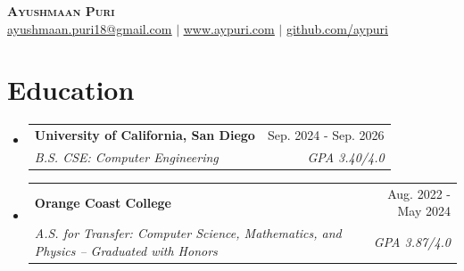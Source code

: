 \documentclass[letterpaper,11pt]{article}
\makeatletter
\newcommand{\resumeSubheading}[4]{
  \vspace{-1pt}\item
    \begin{tabular*}{0.97\textwidth}[t]{l@{\extracolsep{\fill}}r}
      \textbf{#1} & #2 \\
      \textit{\small#3} & \textit{\small #4} \\
    \end{tabular*}\vspace{-8pt}
}
\newcommand{\resumeSubHeadingListStart}{\begin{itemize}[leftmargin=0.15in, label={}]}
\newcommand{\resumeSubHeadingListEnd}{\end{itemize}}
\makeatother
\begin{document}
\begin{center}
    \textbf{\huge \scshape Ayushmaan Puri} \\ \vspace{1pt}
    \href{mailto:ayushmaan.puri18@gmail.com}{\underline{ayushmaan.puri18@gmail.com}} $|$ 
    \href{https://www.aypuri.com}{\underline{www.aypuri.com}} $|$
    \href{https://github.com/aypuri}{\underline{github.com/aypuri}}
\end{center}
\vspace{-25pt}

\section{Education}
  \resumeSubHeadingListStart
    \resumeSubheading
      {University of California, San Diego}{Sep. 2024 - Sep. 2026}
      {B.S. CSE: Computer Engineering}{GPA 3.40/4.0}
    \vspace{2pt}
    \resumeSubheading
      {Orange Coast College}{Aug. 2022 - May 2024}
      {A.S. for Transfer: Computer Science, Mathematics, and Physics -- Graduated with Honors}{GPA 3.87/4.0}
  \resumeSubHeadingListEnd

\end{document}
